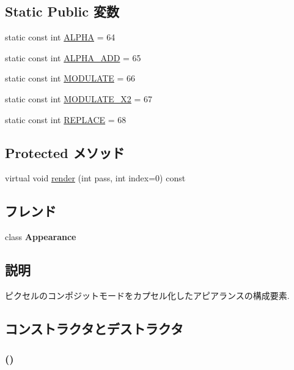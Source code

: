 \subsection*{Static Public 変数}
\begin{CompactItemize}
\item 
static const int \hyperlink{classm3g_1_1CompositingMode_417581fcde4067111f47320edb2aa378}{ALPHA} = 64
\item 
static const int \hyperlink{classm3g_1_1CompositingMode_91ac80a5450e5f7f7e382860829030d9}{ALPHA\_\-ADD} = 65
\item 
static const int \hyperlink{classm3g_1_1CompositingMode_96b64c2847348fb73a90c4a501cda9d1}{MODULATE} = 66
\item 
static const int \hyperlink{classm3g_1_1CompositingMode_cb426684e42a5ae425989c65fbb7dbc4}{MODULATE\_\-X2} = 67
\item 
static const int \hyperlink{classm3g_1_1CompositingMode_47a00ac5a59817a48db06fb2a538883c}{REPLACE} = 68
\end{CompactItemize}
\subsection*{Protected メソッド}
\begin{CompactItemize}
\item 
virtual void \hyperlink{classm3g_1_1CompositingMode_1efcb1973989d9963d5bd6d03065d389}{render} (int pass, int index=0) const 
\end{CompactItemize}
\subsection*{フレンド}
\begin{CompactItemize}
\item 
\hypertarget{classm3g_1_1CompositingMode_afa5201a494f65c37039281d9b63a2a9}{
class \textbf{Appearance}}
\label{classm3g_1_1CompositingMode_afa5201a494f65c37039281d9b63a2a9}

\end{CompactItemize}


\subsection{説明}
ピクセルのコンポジットモードをカプセル化したアピアランスの構成要素. 

\subsection{コンストラクタとデストラクタ}
\hypertarget{classm3g_1_1CompositingMode_5abfd1a798f1327aac4b92f55d4ecc0c}{
\subsubsection[{CompositingMode}]{ ()}}
\label{classm3g_1_1CompositingMode_5abfd1a798f1327aac4b92f55d4ecc0c}


